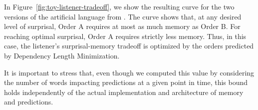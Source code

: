 

In Figure~\ref{fig:toy-listener-tradeoff}, we show the resulting curve for the two versions of the artificial language from \cite{fedzechkina-human-2017}.
The curve shows that, at any desired level of surprisal, Order A requires at most as much memory as Order B.
For reaching optimal surprisal, Order A requires strictly less memory.
Thus, in this case, the listener's surprisal-memory tradeoff is optimized by the orders predicted by Dependency Length Minimization.

It is important to stress that, even though we computed this value by considering the number of words impacting predictions at a given point in time, this bound holds independently of the actual implementation and architecture of memory and predictions.




